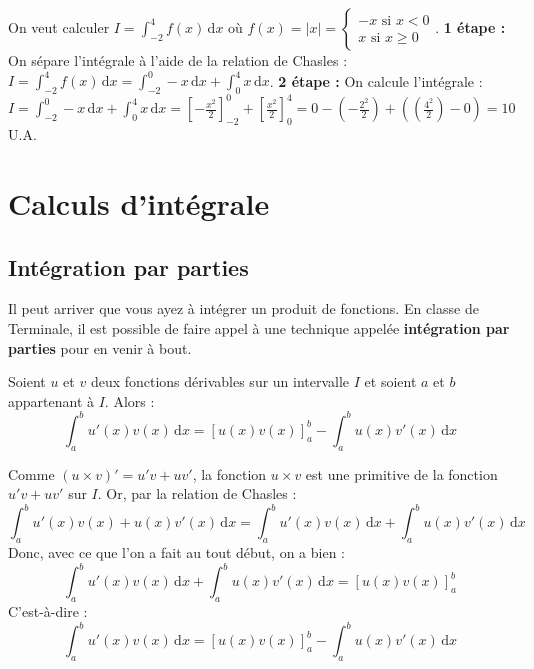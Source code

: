 	\begin{tip}[Exemple]
		On veut calculer $I = \int_{-2}^4 f(x) \, \mathrm{d}x$ où $f(x) = |x| = \begin{cases} -x \text{ si } x < 0 \\ x \text{ si } x \geq 0 \end{cases}$.
		\newpar
		\textbf{1\iere{} étape :} On sépare l'intégrale à l'aide de la relation de Chasles :
		\newpar
		$I = \int_{-2}^{4} f(x) \, \mathrm{d}x = \int_{-2}^{0} -x \, \mathrm{d}x + \int_{0}^{4} x \, \mathrm{d}x$.
		\newpar
		\textbf{2\ieme{} étape :} On calcule l'intégrale :
		\newpar
		$I = \int_{-2}^{0} -x \, \mathrm{d}x + \int_{0}^{4} x \, \mathrm{d}x = \left[ -\frac{x^2}{2} \right]_{-2}^0 + \left[ \frac{x^2}{2} \right]_0^4 = 0 - (-\frac{2^2}{2}) + ((\frac{4^2}{2}) - 0) = 10$ U.A.
	\end{tip}
	
	\section{Calculs d'intégrale}
	
	\subsection{Intégration par parties}
	
	Il peut arriver que vous ayez à intégrer un produit de fonctions. En classe de Terminale, il est possible de faire appel à une technique appelée \textbf{intégration par parties} pour en venir à bout.
	
	\begin{formula}
		Soient $u$ et $v$ deux fonctions dérivables sur un intervalle $I$ et soient $a$ et $b$ appartenant à $I$. Alors :
		\[ \int_a^b u'(x) v(x) \, \mathrm{d}x = \left[u(x) v(x)\right]_a^b - \int_a^b u(x) v'(x) \, \mathrm{d}x \]
	\end{formula}
	
	\begin{demonstration}
		Comme $(u \times v)' = u'v + uv'$, la fonction $u \times v$ est une primitive de la fonction $u'v + uv'$ sur $I$. Or, par la relation de Chasles :
		\[ \int_a^b u'(x) v(x) + u(x) v'(x) \, \mathrm{d}x = \int_a^b u'(x) v(x) \, \mathrm{d}x + \int_a^b u(x) v'(x) \, \mathrm{d}x \]
		Donc, avec ce que l'on a fait au tout début, on a bien :
		\[ \int_a^b u'(x) v(x) \, \mathrm{d}x + \int_a^b u(x) v'(x) \, \mathrm{d}x = \left[u(x) v(x)\right]_a^b \]
		C'est-à-dire :
		\[ \int_a^b u'(x) v(x) \, \mathrm{d}x = \left[u(x) v(x)\right]_a^b - \int_a^b u(x) v'(x) \, \mathrm{d}x \]
	\end{demonstration}
	
